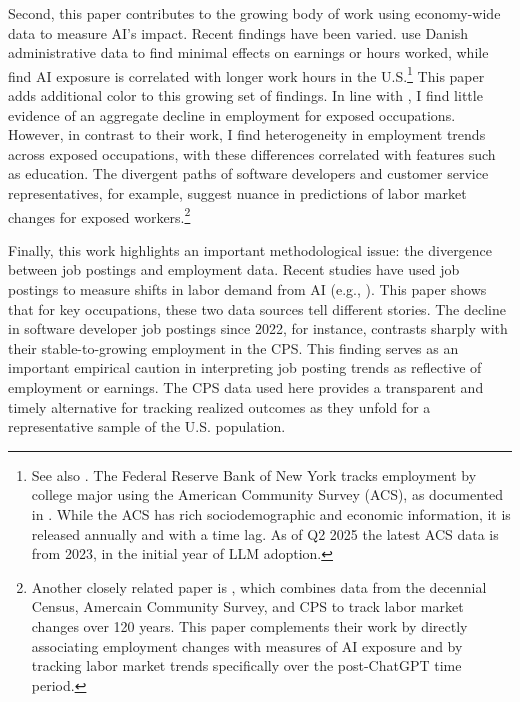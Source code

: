 \documentclass[12pt]{article}
\numberwithin{equation}{section}
\theoremstyle{theorem}\newcustomtheorem{theorem}{{\bf\sc Theorem}}
\theoremstyle{definition}\newcustomtheorem{assumption}{{\bf\sc Assumption}}
\theoremstyle{theorem} \newcustomtheorem{proposition}{{\bf\sc Proposition}}
\begin{document}
Second, this paper contributes to the growing body of work using economy-wide data to measure AI's impact. Recent findings have been varied. \citet{humlum_large_2025} use Danish administrative data to find minimal effects on earnings or hours worked, while \citet{jiang_ai_2025} find AI exposure is correlated with longer work hours in the U.S.\footnote{See also \citet{acemoglu_artificial_2022,bonney_impact_2024,bick_rapid_2024,hartley_labor_2024, frank_ai_2025,chen_displacement_2025,hampole_artificial_2025}. The Federal Reserve Bank of New York tracks employment by college major using the American Community Survey (ACS), as documented in \citet{abel_underemployment_2017}. While the ACS has rich sociodemographic and economic information, it is released annually and with a time lag. As of Q2 2025 the latest ACS data is from 2023, in the initial year of LLM adoption.} This paper adds additional color to this growing set of findings. In line with \citet{humlum_large_2025}, I find little evidence of an aggregate decline in employment for exposed occupations. However, in contrast to their work, I find heterogeneity in employment trends across exposed occupations, with these differences correlated with features such as education. The divergent paths of software developers and customer service representatives, for example, suggest nuance in predictions of labor market changes for exposed workers.\footnote{Another closely related paper is \citet{deming_technological_2025}, which combines data from the decennial Census, Amercain Community Survey, and CPS to track labor market changes over 120 years. This paper complements their work by directly associating employment changes with measures of AI exposure and by tracking labor market trends specifically over the post-ChatGPT time period. }

Finally, this work highlights an important methodological issue: the divergence between job postings and employment data. Recent studies have used job postings to measure shifts in labor demand from AI (e.g., \citet{acemoglu_artificial_2022,hampole_artificial_2025}). This paper shows that for key occupations, these two data sources tell different stories. The decline in software developer job postings since 2022, for instance, contrasts sharply with their stable-to-growing employment in the CPS. This finding serves as an important empirical caution in interpreting job posting trends as reflective of employment or earnings. The CPS data used here provides a transparent and timely alternative for tracking realized outcomes as they unfold for a representative sample of the U.S. population.
\end{document}
